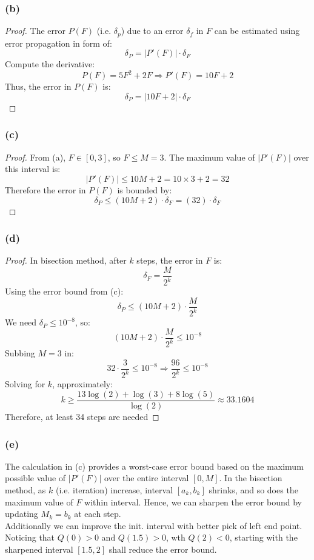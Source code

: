 \documentclass{article}
\begin{document}
\subsubsection*{(b)}
\begin{proof}
    The error $P(F)$ (i.e. $\delta_p$) due to an error $\delta_f$ in $F$ can be estimated using error propagation in form of:
    \[ \delta_P = | P'(F) | \cdot \delta_F \]
    Compute the derivative:
    \[ P(F) = 5F^2 + 2F \Longrightarrow P'(F) = 10F + 2 \]
    Thus, the error in $P(F)$ is:
    \[ \delta_P = | 10F + 2 | \cdot \delta_F \]
\end{proof}

\subsubsection*{(c)}
\begin{proof}
    From (a), $F \in [0,3]$, so $F \leq M = 3$. The maximum value of $| P'(F) |$ over this interval is:
    \[ | P'(F) | \leq 10M + 2 = 10 \times 3 + 2 = 32 \]
    Therefore the error in $P(F)$ is bounded by:
    \[ \delta_P \leq (10M + 2) \cdot \delta_F = (32) \cdot \delta_{F} \]
\end{proof} 

\subsubsection*{(d)}
\begin{proof}
    In bisection method, after $k$ steps, the error in $F$ is:
    \[ \delta_F = \frac{M}{2^k} \]
    Using the error bound from (c):
    \[ \delta_P \leq (10M + 2) \cdot \frac{M}{2^k} \]
    We need $\delta_P \leq 10^{-8}$, so:
    \[ (10M + 2) \cdot \frac{M}{2^k} \leq 10^{-8} \]
    Subbing $M = 3$ in:
    \[ 32 \cdot \frac{3}{2^k} \leq 10^{-8} \Longrightarrow \frac{96}{2^k} \leq 10^{-8} \]
    Solving for $k$, approximately:
    \[ k \geq \frac{13 \log(2) + \log(3) + 8\log(5)}{\log(2)} \approx 33.1604 \]
    Therefore, at least 34 steps are needed
\end{proof} 

\subsubsection*{(e)}
The calculation in (c) provides a worst-case error bound based on the maximum possible value of $| P'(F) |$ 
over the entire interval $[0, M]$. In the bisection method, as $k$ (i.e. iteration) increase, interval $[a_k, b_k]$ shrinks, 
and so does the maximum value of $F$ within interval. Hence, we can sharpen the error bound by updating $M_k = b_k$ at each step.
\\
Additionally we can improve the init. interval with better pick of left end point. 
Noticing that $Q(0) > 0$ and $Q(1.5) > 0$, wth $Q(2) < 0$, starting with the sharpened interval $[1.5, 2]$ shall reduce the error bound.
\end{document}
